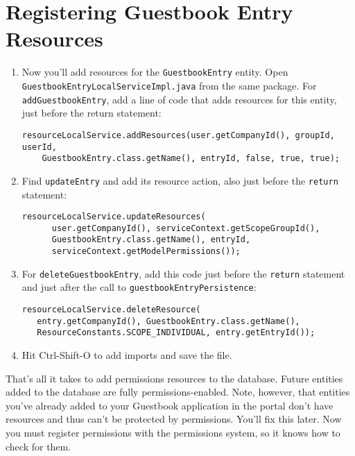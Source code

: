 \section{Registering Guestbook Entry
Resources}\label{registering-guestbook-entry-resources}

\begin{enumerate}
\def\labelenumi{\arabic{enumi}.}
\item
  Now you'll add resources for the \texttt{GuestbookEntry} entity. Open
  \texttt{GuestbookEntryLocalServiceImpl.java} from the same package.
  For \texttt{addGuestbookEntry}, add a line of code that adds resources
  for this entity, just before the return statement:

\begin{verbatim}
resourceLocalService.addResources(user.getCompanyId(), groupId, userId,
    GuestbookEntry.class.getName(), entryId, false, true, true);
\end{verbatim}
\item
  Find \texttt{updateEntry} and add its resource action, also just
  before the \texttt{return} statement:

\begin{verbatim}
resourceLocalService.updateResources(
      user.getCompanyId(), serviceContext.getScopeGroupId(), 
      GuestbookEntry.class.getName(), entryId, 
      serviceContext.getModelPermissions());
\end{verbatim}
\item
  For \texttt{deleteGuestbookEntry}, add this code just before the
  \texttt{return} statement and just after the call to
  \texttt{guestbookEntryPersistence}:

\begin{verbatim}
resourceLocalService.deleteResource(
   entry.getCompanyId(), GuestbookEntry.class.getName(),
   ResourceConstants.SCOPE_INDIVIDUAL, entry.getEntryId());
\end{verbatim}
\item
  Hit Ctrl-Shift-O to add imports and save the file.
\end{enumerate}

That's all it takes to add permissions resources to the database. Future
entities added to the database are fully permissions-enabled. Note,
however, that entities you've already added to your Guestbook
application in the portal don't have resources and thus can't be
protected by permissions. You'll fix this later. Now you must register
permissions with the permissions system, so it knows how to check for
them.

